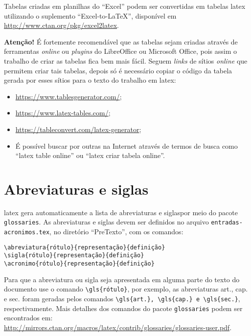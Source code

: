 Tabelas criadas em planilhas do ``Excel'' podem ser convertidas em tabelas \gls{latex} utilizando o suplemento ``Excel-to-LaTeX'', disponível em \url{http://www.ctan.org/pkg/excel2latex}.

\textbf{Atenção!} É fortemente recomendável que as tabelas sejam criadas através de ferramentas \textit{online} ou \textit{plugins} do LibreOffice ou Microsoft Office, pois assim o trabalho de criar as tabelas fica bem mais fácil. Seguem \textit{links} de sítios \textit{online} que permitem criar tais tabelas, depois só é necessário copiar o código da tabela gerada por esses sítios para o texto do trabalho em \gls{latex}:
\begin{itemize}
    \item \url{https://www.tablesgenerator.com/};
    \item \url{https://www.latex-tables.com/};
    \item \url{https://tableconvert.com/latex-generator};
    \item É possível buscar por outras na Internet através de termos de busca como ``latex table online'' ou ``latex criar tabela online''.
\end{itemize}

\section{Abreviaturas e siglas}\label{sec:acronimos}

\gls{latex} gera automaticamente a lista de abreviaturas e siglaspor meio do pacote \texttt{glossaries}. As abreviaturas e siglas devem ser definidos no arquivo \texttt{entradas-acronimos.tex}, no diretório ``PreTexto'', com os comandos:

\begin{SingleSpacing}%
    \begin{verbatim}
\abreviatura{rótulo}{representação}{definição}
\sigla{rótulo}{representação}{definição}
\acronimo{rótulo}{representação}{definição}
\end{verbatim}
\end{SingleSpacing}

Para que a abreviatura ou sigla seja apresentada em alguma parte do texto do documento use o comando \verb|\gls{rótulo}|, por exemplo, as abreviaturas \gls{art.}, \gls{cap.} e \gls{sec.} foram geradas pelos comandos \verb|\gls{art.}, \gls{cap.} e \gls{sec.}|, respectivamente. Mais detalhes dos comandos do pacote \texttt{glossaries} podem ser encontrados em: \url{http://mirrors.ctan.org/macros/latex/contrib/glossaries/glossaries-user.pdf}.

